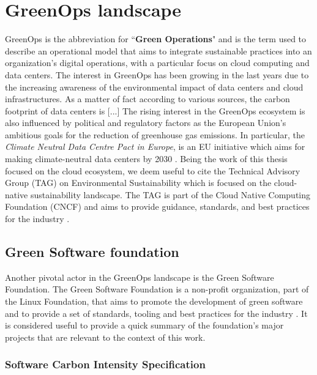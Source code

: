 \section{GreenOps landscape}

GreenOps is the abbreviation for ``\textbf{Green Operations}" and is the term used to describe an operational model that aims to integrate sustainable practices into an organization's digital operations, with a particular focus on cloud computing and data centers.
The interest in GreenOps has been growing in the last years due to the increasing awareness of the environmental impact of data centers and cloud infrastructures.
As a matter of fact according to various sources, the carbon footprint of data centers is [...]
The rising interest in the GreenOps ecosystem is also influenced by political and regulatory factors as the European Union's ambitious goals for the reduction of greenhouse gas emissions.
In particular, the \textit{Climate Neutral Data Centre Pact in Europe}, is an EU initiative which aims for making climate-neutral data centers by 2030 \cite{climate_neutral_data_centre_pact}.
Being the work of this thesis focused on the cloud ecosystem, we deem useful to cite the Technical Advisory Group (TAG) on Environmental Sustainability which is focused on the cloud-native sustainability landscape.
The TAG is part of the Cloud Native Computing Foundation (CNCF) and aims to provide guidance, standards, and best practices for the industry \cite{tag_env_sustainability}.


\subsection{Green Software foundation}

Another pivotal actor in the GreenOps landscape is the Green Software Foundation.
The Green Software Foundation is a non-profit organization, part of the Linux Foundation, that aims to promote the development of green software and to provide a set of standards, tooling and best practices for the industry \cite{green_software_foundation}.
It is considered useful to provide a quick summary of the foundation's major projects that are relevant to the context of this work.

\subsubsection{Software Carbon Intensity Specification}

